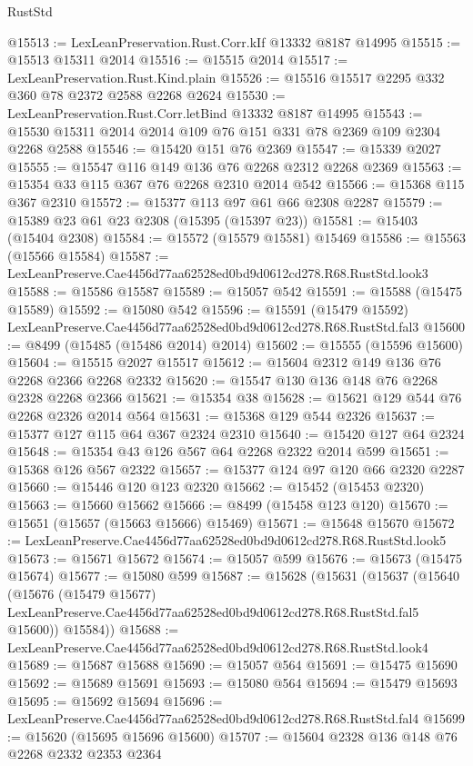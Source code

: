 \begin{lexlean}{RustStd}
\begin{coremodule}
@15513 := LexLeanPreservation.Rust.Corr.kIf @13332 @8187 @14995
@15515 := @15513 @15311 @2014
@15516 := @15515 @2014
@15517 := LexLeanPreservation.Rust.Kind.plain
@15526 := @15516 @15517 @2295 @332 @360 @78 @2372 @2588 @2268 @2624
@15530 := LexLeanPreservation.Rust.Corr.letBind @13332 @8187 @14995
@15543 := @15530 @15311 @2014 @2014 @109 @76 @151 @331 @78 @2369 @109 @2304 @2268 @2588
@15546 := @15420 @151 @76 @2369
@15547 := @15339 @2027
@15555 := @15547 @116 @149 @136 @76 @2268 @2312 @2268 @2369
@15563 := @15354 @33 @115 @367 @76 @2268 @2310 @2014 @542
@15566 := @15368 @115 @367 @2310
@15572 := @15377 @113 @97 @61 @66 @2308 @2287
@15579 := @15389 @23 @61 @23 @2308 (@15395 (@15397 @23))
@15581 := @15403 (@15404 @2308)
@15584 := @15572 (@15579 @15581) @15469
@15586 := @15563 (@15566 @15584)
@15587 := LexLeanPreserve.Cae4456d77aa62528ed0bd9d0612cd278.R68.RustStd.look3
@15588 := @15586 @15587
@15589 := @15057 @542
@15591 := @15588 (@15475 @15589)
@15592 := @15080 @542
@15596 := @15591 (@15479 @15592) LexLeanPreserve.Cae4456d77aa62528ed0bd9d0612cd278.R68.RustStd.fal3
@15600 := @8499 (@15485 (@15486 @2014) @2014)
@15602 := @15555 (@15596 @15600)
@15604 := @15515 @2027 @15517
@15612 := @15604 @2312 @149 @136 @76 @2268 @2366 @2268 @2332
@15620 := @15547 @130 @136 @148 @76 @2268 @2328 @2268 @2366
@15621 := @15354 @38
@15628 := @15621 @129 @544 @76 @2268 @2326 @2014 @564
@15631 := @15368 @129 @544 @2326
@15637 := @15377 @127 @115 @64 @367 @2324 @2310
@15640 := @15420 @127 @64 @2324
@15648 := @15354 @43 @126 @567 @64 @2268 @2322 @2014 @599
@15651 := @15368 @126 @567 @2322
@15657 := @15377 @124 @97 @120 @66 @2320 @2287
@15660 := @15446 @120 @123 @2320
@15662 := @15452 (@15453 @2320)
@15663 := @15660 @15662
@15666 := @8499 (@15458 @123 @120)
@15670 := @15651 (@15657 (@15663 @15666) @15469)
@15671 := @15648 @15670
@15672 := LexLeanPreserve.Cae4456d77aa62528ed0bd9d0612cd278.R68.RustStd.look5
@15673 := @15671 @15672
@15674 := @15057 @599
@15676 := @15673 (@15475 @15674)
@15677 := @15080 @599
@15687 := @15628
    (@15631
      (@15637
        (@15640
          (@15676
            (@15479 @15677)
            LexLeanPreserve.Cae4456d77aa62528ed0bd9d0612cd278.R68.RustStd.fal5
            @15600))
        @15584))
@15688 := LexLeanPreserve.Cae4456d77aa62528ed0bd9d0612cd278.R68.RustStd.look4
@15689 := @15687 @15688
@15690 := @15057 @564
@15691 := @15475 @15690
@15692 := @15689 @15691
@15693 := @15080 @564
@15694 := @15479 @15693
@15695 := @15692 @15694
@15696 := LexLeanPreserve.Cae4456d77aa62528ed0bd9d0612cd278.R68.RustStd.fal4
@15699 := @15620 (@15695 @15696 @15600)
@15707 := @15604 @2328 @136 @148 @76 @2268 @2332 @2353 @2364

\end{coremodule}
\end{lexlean}
